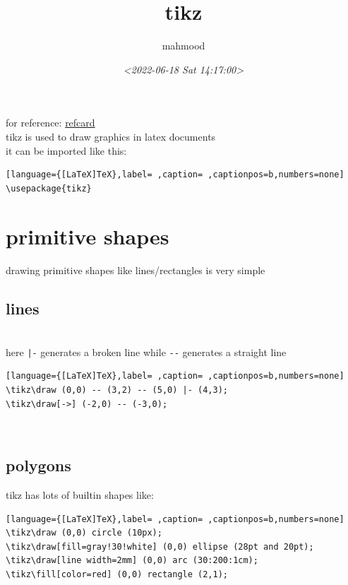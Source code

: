 \documentclass[a4paper,12pt]{article}
\author{mahmood}
\date{\textit{<2022-06-18 Sat 14:17:00>}}
\title{tikz}
\begin{document}
\maketitle
for reference: \href{./tikz\_refcard.pdf}{refcard}\\[0pt]

tikz is used to draw graphics in latex documents\\[0pt]
it can be imported like this:\\[0pt]

\begin{lstlisting}[language={[LaTeX]TeX},label= ,caption= ,captionpos=b,numbers=none]
\usepackage{tikz}
\end{lstlisting}

\section{primitive shapes}
\label{sec:org53e38fe}
drawing primitive shapes like lines/rectangles is very simple\\[0pt]
\subsection{lines}
\label{sec:org9b3e97a}
\\[0pt]

here \texttt{|-} generates a broken line while \texttt{-{}-} generates a straight line\\[0pt]
\begin{lstlisting}[language={[LaTeX]TeX},label= ,caption= ,captionpos=b,numbers=none]
\tikz\draw (0,0) -- (3,2) -- (5,0) |- (4,3);
\tikz\draw[->] (-2,0) -- (-3,0);
\end{lstlisting}

\\[0pt]

\subsection{polygons}
\label{sec:org79d58db}
tikz has lots of builtin shapes like:\\[0pt]
\begin{lstlisting}[language={[LaTeX]TeX},label= ,caption= ,captionpos=b,numbers=none]
\tikz\draw (0,0) circle (10px);
\tikz\draw[fill=gray!30!white] (0,0) ellipse (28pt and 20pt);
\tikz\draw[line width=2mm] (0,0) arc (30:200:1cm);
\tikz\fill[color=red] (0,0) rectangle (2,1);
\end{lstlisting}
\end{document}
